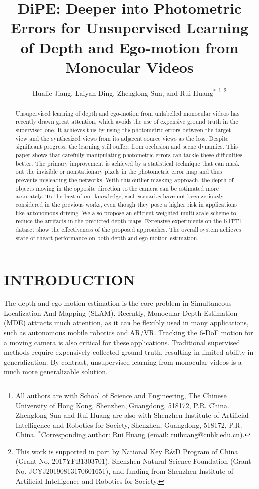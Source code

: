 \documentclass[letterpaper, 10 pt, conference]{ieeeconf}
\title{\LARGE \bf
DiPE: Deeper into Photometric Errors for Unsupervised Learning of Depth and Ego-motion from Monocular Videos}
\author{Hualie Jiang, Laiyan Ding, Zhenglong Sun, and Rui Huang$^{*}$ 
\thanks{All authors are with School of Science and Engineering, The Chinese University of Hong Kong, Shenzhen, Guangdong, 518172, P.R. China. Zhenglong Sun and Rui Huang are also with Shenzhen Institute of Artificial Intelligence and Robotics for Society, Shenzhen, Guangdong, 518172, P.R. China. $^{*}$Corresponding author: Rui Huang (email: \href{mailto:ruihuang@cuhk.edu.cn}{ruihuang@cuhk.edu.cn}).} \thanks{This work is supported in part by National Key R\&D Program of China (Grant No. 2017YFB1303701), Shenzhen Natural Science Foundation (Grant No. JCYJ20190813170601651), and funding from Shenzhen Institute of Artificial Intelligence and Robotics for Society.
}}
\begin{document}
\maketitle
\thispagestyle{empty}
\pagestyle{empty}


\begin{abstract}

Unsupervised learning of depth and ego-motion from unlabelled monocular videos has recently drawn great
attention, which avoids the use of expensive ground truth in the supervised one.
It achieves this by using the photometric errors between the target view and the synthesized views from its adjacent source views as the loss. Despite significant progress, the learning still suffers from occlusion and scene dynamics. 
This paper shows that carefully manipulating photometric errors can tackle these difficulties better.
The primary improvement is achieved by a statistical technique that can mask out the invisible or nonstationary pixels in the photometric error map and thus prevents misleading the networks. 
With this outlier masking approach, the depth of objects moving in the opposite direction to the camera can be estimated more accurately.
To the best of our knowledge, such scenarios have not been seriously considered in the previous works, even though they pose a higher risk in applications like autonomous driving.
We also propose an efficient weighted multi-scale scheme to reduce the artifacts in the predicted depth maps. Extensive experiments on the KITTI dataset show the effectiveness of the proposed approaches.
The overall system achieves state-of-theart performance on both depth and ego-motion estimation.

\end{abstract}




\section{INTRODUCTION}
The depth and ego-motion estimation is the core problem in Simultaneous Localization And Mapping (SLAM). 
Recently, Monocular Depth Estimation (MDE) attracts much attention, as it can be flexibly used in many applications, such as autonomous mobile robotics and AR/VR. 
Tracking the 6-DoF motion for a moving camera is also critical for these applications. 
Traditional supervised methods require expensively-collected ground truth, resulting in limited ability in generalization. 
By contrast, unsupervised learning from monocular videos \cite{zhou2017unsupervised} is a much more generalizable solution. 
\end{document}
